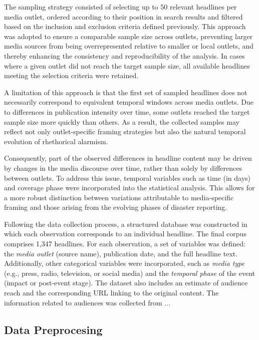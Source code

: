 The sampling strategy consisted of selecting up to 50 relevant headlines per media outlet, ordered according to their 
position in search results and filtered based on the inclusion and exclusion criteria defined previously. This approach was adopted to 
ensure a comparable sample size across outlets, preventing larger media sources from being overrepresented relative to smaller or local outlets, 
and thereby enhancing the consistency and reproducibility of the analysis. In cases where a given outlet did not reach the target sample size, 
all available headlines meeting the selection criteria were retained.

A limitation of this approach is that the first set of sampled headlines does not necessarily correspond to equivalent temporal windows across media outlets.
 Due to differences in publication intensity over time, some outlets reached the target sample size more quickly than others. As a result, 
 the collected samples may reflect not only outlet-specific framing strategies but also the natural temporal evolution of rhethorical alarmism.

Consequently, part of the observed differences in headline content may be driven by changes in the media discourse over time, 
rather than solely by differences between outlets. To address this issue, temporal variables such as time (in days) and coverage phase were 
incorporated into the statistical analysis. This allows for a more robust distinction between variations attributable
 to media-specific framing and those arising from the evolving phases of disaster reporting.

Following the data collection process, a structured database was constructed in which each observation corresponds to an individual headline. 
The final corpus comprises 1,347 headlines. For each observation, a set of variables was defined: the \textit{media outlet} (source name), publication date, 
and the full headline text. Additionally, other categorical variables were incorporated, such as \textit{media type} (e.g., press, radio, television, or 
social media) and the \textit{temporal phase} of the event (impact or post-event stage). The dataset also includes an estimate 
of audience reach and the corresponding URL linking to the original content. The information related to audiences was collected from ... 

\subsection{Data Preprocesing}

